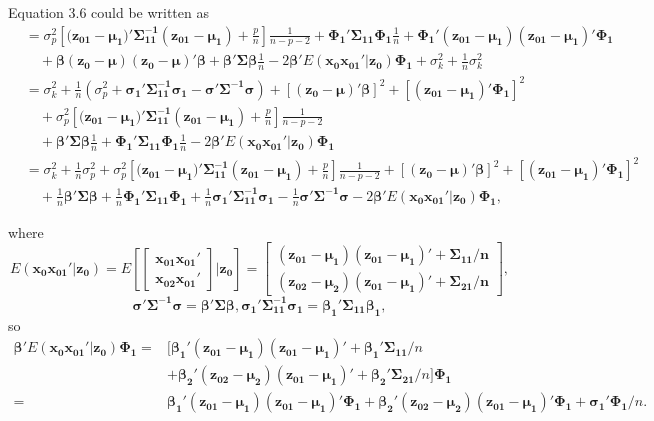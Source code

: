 Equation 3.6 could be written as
$$\begin{aligned}
&=\sigma_p^2 \left[(\boldsymbol{z_{01}-\mu_1)'\Sigma_{11}^{-1}(z_{01}-\mu_1)}+\frac{p}{n}\right]\frac{1}{n-p-2}+\boldsymbol{\Phi_1'\Sigma_{11}\Phi_1}\frac{1}{n}+\boldsymbol{\Phi_{1}'(z_{01}-\mu_{1})(z_{01}-\mu_1)'\Phi_1}\\
&\quad+\boldsymbol{\beta}\boldsymbol{(z_0-\mu)(z_0-\mu)'\beta}+\boldsymbol{\beta'\Sigma}\boldsymbol{\beta}\frac{1}{n} -2\boldsymbol{\beta'}E(\boldsymbol{x_0x_{01}'}|\boldsymbol{z_0})\boldsymbol{\Phi_1}+\sigma_k^2+\frac{1}{n}\sigma_k^2\\
&=\sigma_k^2+\frac{1}{n}(\sigma_p^2+\boldsymbol{\sigma_1'\Sigma_{11}^{-1}\sigma_1-\sigma'\Sigma^{-1}\sigma})+[\boldsymbol{(z_{0}-\mu)'\beta}]^2+[\boldsymbol{(z_{01}-\mu_1)'\Phi_1}]^2\\
&\quad+\sigma_p^2 \left[(\boldsymbol{z_{01}-\mu_1)'\Sigma_{11}^{-1}(z_{01}-\mu_1)}+\frac{p}{n}\right]\frac{1}{n-p-2}\\
&\quad+\boldsymbol{\beta'\Sigma\beta}\frac{1}{n}+\boldsymbol{\Phi_1'\Sigma_{11}\Phi_1}\frac{1}{n}-2\boldsymbol{\beta'}E(\boldsymbol{x_0x_{01}'}|\boldsymbol{z_0})\boldsymbol{\Phi_1}\\
&=\sigma_k^2+\frac{1}{n}\sigma_p^2+\sigma_p^2 \left[(\boldsymbol{z_{01}-\mu_1)'\Sigma_{11}^{-1}(z_{01}-\mu_1)}+\frac{p}{n}\right]\frac{1}{n-p-2}
+[\boldsymbol{(z_{0}-\mu)'\beta}]^2+[\boldsymbol{(z_{01}-\mu_1)'\Phi_1}]^2\\
&\quad+\frac{1}{n}\boldsymbol{\beta'\Sigma\beta}+\frac{1}{n}\boldsymbol{\Phi_1'\Sigma_{11}\Phi_1}+\frac{1}{n}\boldsymbol{\sigma_1'\Sigma_{11}^{-1}\sigma_1}-\frac{1}{n}\boldsymbol{\sigma'\Sigma^{-1}\sigma}-2\boldsymbol{\beta'}E(\boldsymbol{x_0x_{01}'}|\boldsymbol{z_0})\boldsymbol{\Phi_1},
\end{aligned}$$

where $$E(\boldsymbol{x_0x_{01}'}|\boldsymbol{z_0})=E\left[\begin{bmatrix}
\boldsymbol{x_{01}x_{01}'}\\
\boldsymbol{x_{02}x_{01}'}
\end{bmatrix}|\boldsymbol{z_0}\right]=\begin{bmatrix}\boldsymbol{
(z_{01}-\mu_1)(z_{01}-\mu_1)'+\Sigma_{11}/n}\\
\boldsymbol{(z_{02}-\mu_2)(z_{01}-\mu_1)'+\Sigma_{21}/n}
\end{bmatrix},$$
$$\boldsymbol{\sigma'\Sigma^{-1}\sigma=\beta'\Sigma\beta}, \boldsymbol{\sigma_1'\Sigma_{11}^{-1}\sigma_1=\beta_1'\Sigma_{11}\beta_1},$$
so 
$$\begin{aligned}
\boldsymbol{\beta'}E(\boldsymbol{x_0x_{01}'}|\boldsymbol{z_0})\boldsymbol{\Phi_1}
=&[\boldsymbol{\beta_1'(z_{01}-\mu_1)(z_{01}-\mu_1)'+\beta_1'\Sigma_{11}}/n\\
&+\boldsymbol{\beta_2'(z_{02}-\mu_2)(z_{01}-\mu_1)'+\beta_2'\Sigma_{21}}/n]\boldsymbol{\Phi_1}\\
=&\boldsymbol{\beta_1'(z_{01}-\mu_1)(z_{01}-\mu_1)'\Phi_1}+\boldsymbol{\beta_2'(z_{02}-\mu_2)(z_{01}-\mu_1)'\Phi_1}+\boldsymbol{\sigma_1'\Phi_1}/n.\\
\end{aligned}$$

